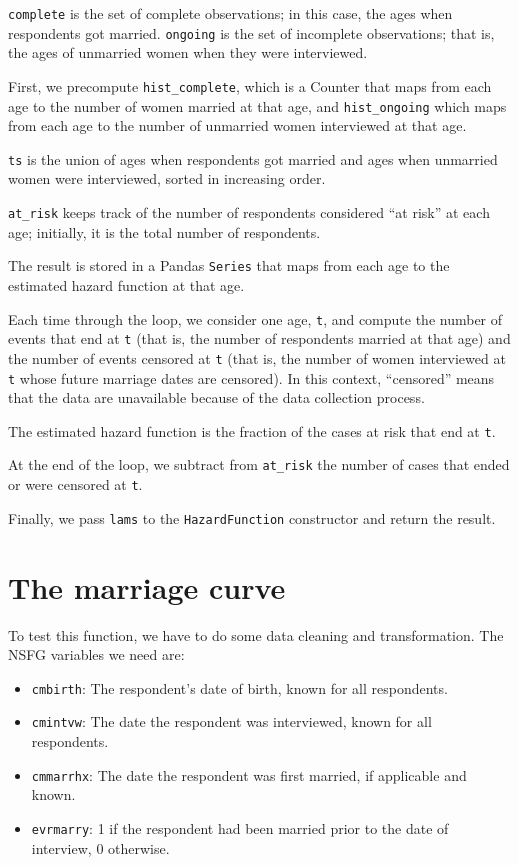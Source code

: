 \documentclass[12pt]{book}
\begin{document}
{\tt complete} is the set of complete observations; in this case,
the ages when respondents got married.  {\tt ongoing} is the set
of incomplete observations; that is, the ages of unmarried women
when they were interviewed.

First, we precompute \verb"hist_complete", which is a Counter
that maps from each age to the number of women married at that
age, and \verb"hist_ongoing" which maps from each age to the
number of unmarried women interviewed at that age.


{\tt ts} is the union of ages when respondents got married
and ages when unmarried women were interviewed, sorted in
increasing order.

\verb"at_risk" keeps track of the number of respondents considered
``at risk'' at each age; initially, it is the total number of
respondents.

The result is stored in a Pandas {\tt Series} that maps from
each age to the estimated hazard function at that age.

Each time through the loop, we consider one age, {\tt t},
and compute the number of events that end at {\tt t} (that is,
the number of respondents married at that age) and the number
of events censored at {\tt t} (that is, the number of women
interviewed at {\tt t} whose future marriage dates are
censored).  In this context, ``censored'' means that the
data are unavailable because of the data collection process.

The estimated hazard function is the fraction of the cases
at risk that end at {\tt t}.

At the end of the loop, we subtract from \verb"at_risk" the
number of cases that ended or were censored at {\tt t}.

Finally, we pass {\tt lams} to the {\tt HazardFunction}
constructor and return the result.



\section{The marriage curve}

To test this function, we have to do some data cleaning and
transformation.  The NSFG variables we need are:

\begin{itemize}

\item {\tt cmbirth}: The respondent's date of birth, known for
all respondents.

\item {\tt cmintvw}: The date the respondent was interviewed,
known for all respondents.

\item {\tt cmmarrhx}: The date the respondent was first married,
if applicable and known.

\item {\tt evrmarry}: 1 if the respondent had been
married prior to the date of interview, 0 otherwise.

\end{itemize}
\end{document}
